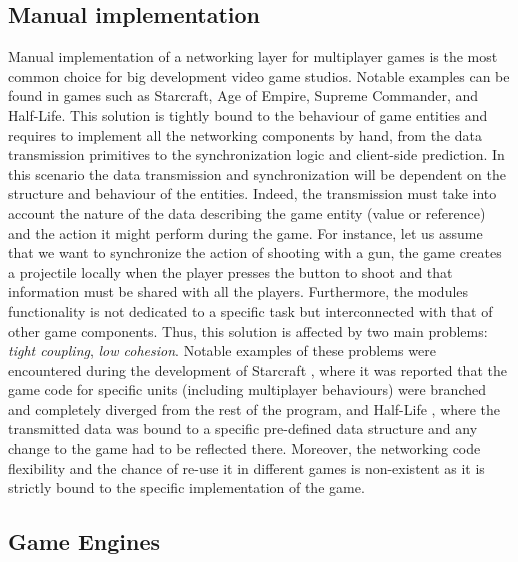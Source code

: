 \subsection{Manual implementation}
Manual implementation of a networking layer for multiplayer games is the most common choice for big development video game studios. Notable examples can be found in games such as Starcraft, Age of Empire, Supreme Commander, and Half-Life. This solution is tightly bound to the behaviour of game entities and requires to implement all the networking components by hand, from the data transmission primitives to the synchronization logic and client-side prediction. In this scenario the data transmission and synchronization will be dependent on the structure and behaviour of the entities. Indeed, the transmission must take into account the nature of the data describing the game entity (value or reference) and the action it might perform during the game. For instance, let us assume that we want to synchronize the action of shooting with a gun, the game creates a projectile locally when the player presses the button to shoot and that information must be shared with all the players. Furthermore, the modules functionality is not dedicated to a specific task but interconnected with that of other game components. Thus, this solution is affected by two main problems: \textit{tight coupling}, \textit{low cohesion}. Notable examples of these problems were encountered during the development of Starcraft \cite{starcraft}, where it was reported that the game code for specific units (including multiplayer behaviours) were branched and completely diverged from the rest of the program, and Half-Life \cite{bernier2001latency}, where the transmitted data was bound to a specific pre-defined data structure and any change to the game had to be reflected there. Moreover, the networking code flexibility and the chance of re-use it in different games is non-existent as it is strictly bound to the specific implementation of the game.

\subsection{Game Engines}

